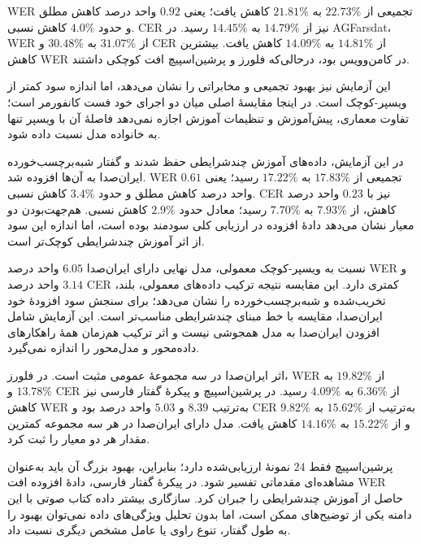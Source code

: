 WER تجمیعی از $22.73\%$ به $21.81\%$ کاهش یافت؛ یعنی $0.92$ واحد درصد کاهش مطلق و حدود $4.0\%$ کاهش نسبی. CER نیز از $14.79\%$ به $14.45\%$ رسید. در AGFarsdat، WER از $31.07\%$ به $30.48\%$ و CER از $14.81\%$ به $14.09\%$ کاهش یافت. بیشترین کاهش WER در کامن‌وویس بود، درحالی‌که فلورز و پرشین‌اسپیچ افت کوچکی داشتند.

این آزمایش نیز بهبود تجمیعی و مخابراتی را نشان می‌دهد، اما اندازه سود کمتر از ویسپر-کوچک است. در اینجا مقایسهٔ اصلی میان دو اجرای خود فست کانفورمر است؛ تفاوت معماری، پیش‌آموزش و تنظیمات آموزش اجازه نمی‌دهد فاصلهٔ آن با ویسپر تنها به خانواده مدل نسبت داده شود.



در این آزمایش، داده‌های آموزش چندشرایطی حفظ شدند و گفتار شبه‌برچسب‌خورده ایران‌صدا به آن‌ها افزوده شد. WER تجمیعی از $17.83\%$ به $17.22\%$ رسید؛ یعنی $0.61$ واحد درصد کاهش مطلق و حدود $3.4\%$ کاهش نسبی. CER نیز با $0.23$ واحد درصد کاهش، از $7.93\%$ به $7.70\%$ رسید؛ معادل حدود $2.9\%$ کاهش نسبی. هم‌جهت‌بودن دو معیار نشان می‌دهد دادهٔ افزوده در ارزیابی کلی سودمند بوده است، اما اندازه این سود از اثر آموزش چندشرایطی کوچک‌تر است.

نسبت به ویسپر-کوچک معمولی، مدل نهایی دارای ایران‌صدا $6.05$ واحد درصد WER و $3.14$ واحد درصد CER کمتری دارد. این مقایسه نتیجه ترکیب داده‌های معمولی، بلند، تخریب‌شده و شبه‌برچسب‌خورده را نشان می‌دهد؛ برای سنجش سود افزودهٔ خود ایران‌صدا، مقایسه با خط مبنای چندشرایطی مناسب‌تر است. این آزمایش شامل افزودن ایران‌صدا به مدل همجوشی نیست و اثر ترکیب هم‌زمان همهٔ راهکارهای داده‌محور و مدل‌محور را اندازه نمی‌گیرد.


اثر ایران‌صدا در سه مجموعهٔ عمومی مثبت است. در فلورز، WER از $19.82\%$ به $13.78\%$ و CER از $6.36\%$ به $4.09\%$ رسید. در پرشین‌اسپیچ و پیکرهٔ گفتار فارسی نیز کاهش WER به‌ترتیب $8.39$ و $5.03$ واحد درصد بود و CER به‌ترتیب از $15.62\%$ به $9.82\%$ و از $15.22\%$ به $14.16\%$ کاهش یافت. مدل دارای ایران‌صدا در هر سه مجموعه کمترین مقدار هر دو معیار را ثبت کرد.

پرشین‌اسپیچ فقط $24$ نمونهٔ ارزیابی‌شده دارد؛ بنابراین، بهبود بزرگ آن باید به‌عنوان مشاهده‌ای مقدماتی تفسیر شود. در پیکرهٔ گفتار فارسی، دادهٔ افزوده افت WER حاصل از آموزش چندشرایطی را جبران کرد. سازگاری بیشتر داده کتاب صوتی با این دامنه یکی از توضیح‌های ممکن است، اما بدون تحلیل ویژگی‌های داده نمی‌توان بهبود را به طول گفتار، تنوع راوی یا عامل مشخص دیگری نسبت داد.

